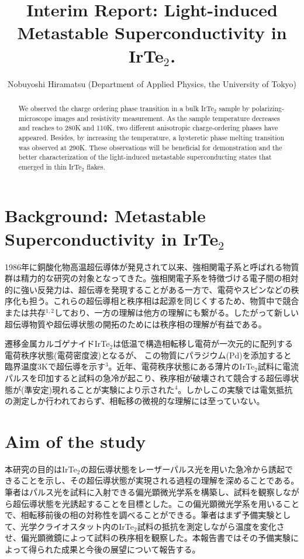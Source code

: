\documentclass[11pt,a4paper]{article}
\title{\vspace{-1.5zh}Interim Report: Light-induced Metastable Superconductivity in IrTe$_2$.}
\author{\vspace{-2zh}Nobuyoshi Hiramatsu (Department of Applied Physics, the University of Tokyo) }
\date{}
\begin{document}
\maketitle
\thispagestyle{mypagestyle}


\begin{abstract}
We observed the charge ordering phase transition in a bulk IrTe$_2$ sample by polarizing-microscope images and resistivity measurement. As the sample temperature decreases and reaches to 280K and 110K, two different anisotropic charge-ordering phases have appeared. Besides, by increasing the temperature, a hysteretic phase melting transition was observed at 290K. These observations will be beneficial for demonstration and the better characterization of the light-induced metastable superconducting states that emerged in thin IrTe$_2$ flakes.
\end{abstract}


\section{Background: Metastable Superconductivity in IrTe$_2$}
1986年に銅酸化物高温超伝導体が発見されて以来、強相関電子系と呼ばれる物質群は精力的な研究の対象となってきた。強相関電子系を特徴づける電子間の相対的に強い反発力は、超伝導を発現することがある一方で、電荷やスピンなどの秩序化も担う。これらの超伝導相と秩序相は起源を同じくするため、物質中で競合または共存$^{1,2}$しており、一方の理解は他方の理解にも繋がる。したがって新しい超伝導物質や超伝導状態の開拓のためには秩序相の理解が有益である。

遷移金属カルゴゲナイドIrTe$_2$は低温で構造相転移し電荷が一次元的に配列する電荷秩序状態(電荷密度波)となるが、
この物質にパラジウム(Pd)を添加すると臨界温度3Kで超伝導を示す$^3$。近年、電荷秩序状態にある薄片のIrTe$_2$試料に電流パルスを印加すると試料の急冷が起こり、秩序相が破壊されて競合する超伝導状態が(準安定)現れることが実験により示された$^4$。しかしこの実験では電気抵抗の測定しか行われておらず、相転移の微視的な理解には至っていない。

\section{Aim of the study}
本研究の目的はIrTe$_2$の超伝導状態をレーザーパルス光を用いた急冷から誘起できることを示し、その超伝導状態が実現される過程の理解を深めることである。筆者はパルス光を試料に入射できる偏光顕微光学系を構築し、試料を観察しながら超伝導状態を光誘起することを目標とした。この偏光顕微光学系を用いることで、相転移前後の相の対称性を調べることができる。筆者はまず予備実験として、光学クライオスタット内のIrTe$_2$試料の抵抗を測定しながら温度を変化させ、偏光顕微鏡によって試料の秩序相を観察した。本報告書ではその予備実験によって得られた成果と今後の展望について報告する。
\end{document}
